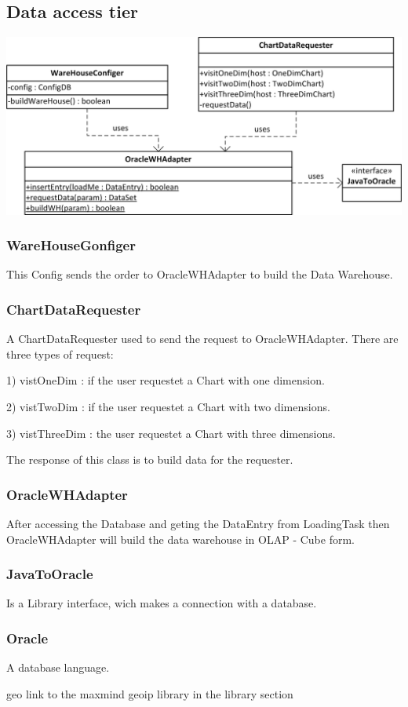 \subsection{Data access tier}

\begin{center}
\includegraphics{Pictures/Parts/Data.png}
\end{center} 

\subsubsection*{WareHouseGonfiger}

This Config sends the order to OracleWHAdapter to build the Data Warehouse.

\subsubsection*{ChartDataRequester}

A ChartDataRequester used to send the request to OracleWHAdapter.
There are three types of request:

1) vistOneDim : if the user requestet a Chart with one dimension.

2) vistTwoDim : if the user requestet a Chart with two dimensions.

3) vistThreeDim : the user requestet a Chart with three dimensions.

The response of this class is to build data for the requester.

\subsubsection*{OracleWHAdapter}

After accessing the Database and geting the DataEntry from LoadingTask then OracleWHAdapter will build
the data warehouse in OLAP - Cube form. 
 
\subsubsection*{JavaToOracle}

Is a Library interface, wich makes a connection with a database.

\subsubsection*{Oracle}

A database language. %

geo
 link to the maxmind geoip library in the library section
